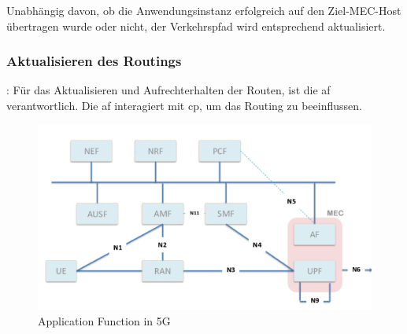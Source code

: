 \documentclass[runningheads]{llncs}
\numberwithin{figure}{section}
\begin{document}
Unabhängig davon, ob die Anwendungsinstanz erfolgreich auf den Ziel-MEC-Host übertragen wurde oder nicht, 
der Verkehrspfad wird entsprechend aktualisiert.
\subsubsection{Aktualisieren des Routings}:
Für das Aktualisieren und Aufrechterhalten der Routen, ist die \acrlong{af} verantwortlich.
Die \acrfull{af} interagiert mit \acrshort{cp},  um das Routing zu beeinflussen. 

\begin{figure}
  \includegraphics[width=\linewidth]{images/AF_5G.png}
  \caption{Application Function in 5G}
  \label{fig:AF_GG}
\end{figure}
\end{document}
